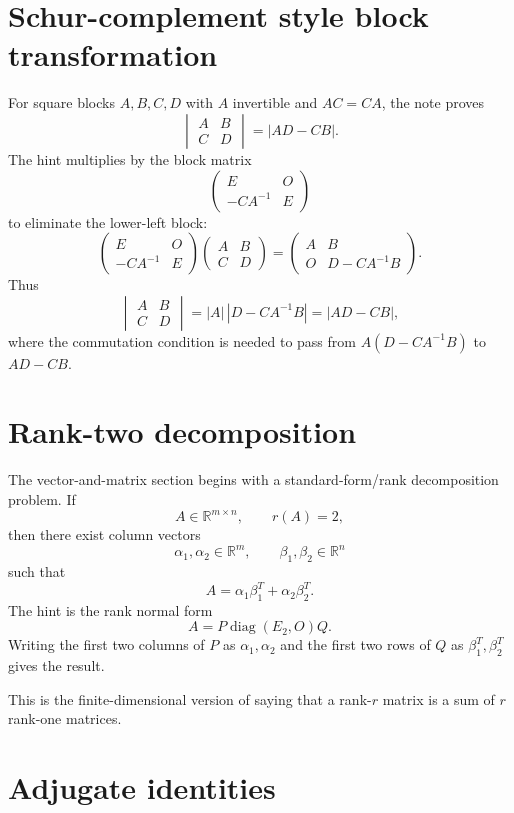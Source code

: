 \section{Schur-complement style block transformation}

For square blocks $A,B,C,D$ with $A$ invertible and $AC=CA$, the note proves
\[
  \begin{vmatrix}A&B\\C&D\end{vmatrix}=|AD-CB|.
\]
The hint multiplies by the block matrix
\[
  \begin{pmatrix}E&O\\-CA^{-1}&E\end{pmatrix}
\]
to eliminate the lower-left block:
\[
  \begin{pmatrix}E&O\\-CA^{-1}&E\end{pmatrix}
  \begin{pmatrix}A&B\\C&D\end{pmatrix}
  =
  \begin{pmatrix}A&B\\O&D-CA^{-1}B\end{pmatrix}.
\]
Thus
\[
  \begin{vmatrix}A&B\\C&D\end{vmatrix}
  =|A|\,|D-CA^{-1}B|
  =|AD-CB|,
\]
where the commutation condition is needed to pass from $A(D-CA^{-1}B)$ to $AD-CB$.

\section{Rank-two decomposition}

The vector-and-matrix section begins with a standard-form/rank decomposition problem.  If
\[
  A\in\mathbb R^{m\times n},\qquad r(A)=2,
\]
then there exist column vectors
\[
  \alpha_1,\alpha_2\in\mathbb R^m,\qquad
  \beta_1,\beta_2\in\mathbb R^n
\]
such that
\[
  A=\alpha_1\beta_1^T+\alpha_2\beta_2^T.
\]
The hint is the rank normal form
\[
  A=P\operatorname{diag}(E_2,O)Q.
\]
Writing the first two columns of $P$ as $\alpha_1,\alpha_2$ and the first two rows of $Q$ as $\beta_1^T,\beta_2^T$ gives the result.

This is the finite-dimensional version of saying that a rank-$r$ matrix is a sum of $r$ rank-one matrices.

\section{Adjugate identities}

